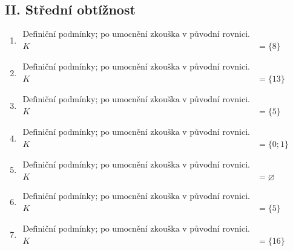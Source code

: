 \documentclass[11pt,a4paper]{article}
\begin{document}
\subsection*{II. Střední obtížnost}
\begin{enumerate}[label={},itemsep=9pt]
\item[\textbf{F011}] \(\displaystyle \begin{aligned}\text{Definiční podmínky; po umocnění zkouška v původní rovnici.}\\K&=\{8\}\end{aligned}\)\par
\item[\textbf{F012}] \(\displaystyle \begin{aligned}\text{Definiční podmínky; po umocnění zkouška v původní rovnici.}\\K&=\{13\}\end{aligned}\)\par
\item[\textbf{F013}] \(\displaystyle \begin{aligned}\text{Definiční podmínky; po umocnění zkouška v původní rovnici.}\\K&=\{5\}\end{aligned}\)\par
\item[\textbf{F014}] \(\displaystyle \begin{aligned}\text{Definiční podmínky; po umocnění zkouška v původní rovnici.}\\K&=\{0;1\}\end{aligned}\)\par
\item[\textbf{F015}] \(\displaystyle \begin{aligned}\text{Definiční podmínky; po umocnění zkouška v původní rovnici.}\\K&=\varnothing\end{aligned}\)\par
\item[\textbf{F016}] \(\displaystyle \begin{aligned}\text{Definiční podmínky; po umocnění zkouška v původní rovnici.}\\K&=\{5\}\end{aligned}\)\par
\item[\textbf{F017}] \(\displaystyle \begin{aligned}\text{Definiční podmínky; po umocnění zkouška v původní rovnici.}\\K&=\{16\}\end{aligned}\)\par

\end{enumerate}
\end{document}
